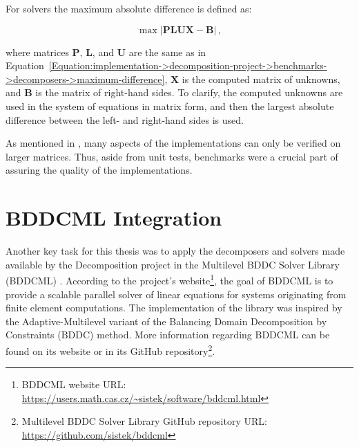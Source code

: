 For solvers the maximum absolute difference is defined as:

\begin{equation}
	\max \left| \mathbf{PLUX} - \mathbf{B} \right| \,,
	\label{Equation:implementation->decomposition-project->benchmarks->solvers->maximum-difference}
\end{equation}

where matrices $\mathbf{P}$, $\mathbf{L}$, and $\mathbf{U}$ are the same as in Equation~\ref{Equation:implementation->decomposition-project->benchmarks->decomposers->maximum-difference}, $\mathbf{X}$ is the computed matrix of unknowns, and $\mathbf{B}$ is the matrix of right-hand sides.
To clarify, the computed unknowns are used in the system of equations in matrix form, and then the largest absolute difference between the left- and right-hand sides is used.

As mentioned in  \cite{Cejka2022}, many aspects of the implementations can only be verified on larger matrices.
Thus, aside from unit tests, benchmarks were a crucial part of assuring the quality of the implementations.




\section{BDDCML Integration}\label{Section:implementation->BDDCML}
Another key task for this thesis was to apply the decomposers and solvers made available by the Decomposition project in the Multilevel BDDC Solver Library (BDDCML) \cite{Sistek2011, Sistek2012, Sousedik2013, Sistek2015}.
According to the project's website\footnote{\label{Footnote:implementation->BDDCML-integration->BDDCML-website}BDDCML website URL: \url{https://users.math.cas.cz/~sistek/software/bddcml.html}}, the goal of BDDCML is to provide a scalable parallel solver of linear equations for systems originating from finite element computations.
The implementation of the library was inspired by the Adaptive-Multilevel variant of the Balancing Domain Decomposition by Constraints (BDDC) method.
More information regarding BDDCML can be found on its website or in its GitHub repository\footnote{Multilevel BDDC Solver Library GitHub repository URL: \url{https://github.com/sistek/bddcml}}.

